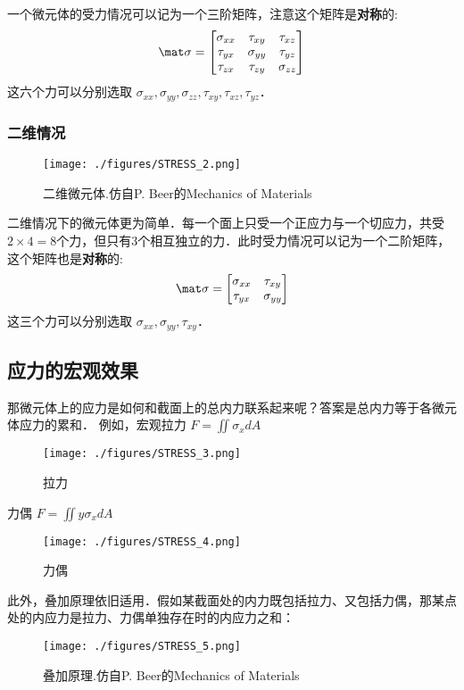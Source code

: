 一个微元体的受力情况可以记为一个三阶矩阵，注意这个矩阵是\textbf{对称}的:
\begin{equation}
\mat \sigma=
\begin{bmatrix}
\sigma_{xx} & \tau_{xy} & \tau_{xz} \\
\tau_{yx} & \sigma_{yy} & \tau_{yz} \\
\tau_{zx} & \tau_{zy} & \sigma_{zz} \\
\end{bmatrix}
\end{equation}
这六个力可以分别选取 $\sigma_{xx}, \sigma_{yy},\sigma_{zz}, \tau_{xy}, \tau_{xz},  \tau_{yz}$．

\subsubsection{二维情况}
\begin{figure}[ht]
\centering
\texttt{[image: ./figures/STRESS\_2.png]}
\caption{二维微元体.仿自P. Beer的Mechanics of Materials} \label{STRESS_fig2}
\end{figure}

二维情况下的微元体更为简单．每一个面上只受一个正应力与一个切应力，共受$2\times4=8$个力，但只有3个相互独立的力．此时受力情况可以记为一个二阶矩阵，这个矩阵也是\textbf{对称}的:
\begin{equation}
\mat \sigma=
\begin{bmatrix}
\sigma_{xx} & \tau_{xy}\\
\tau_{yx} & \sigma_{yy}\\
\end{bmatrix}
\end{equation}
这三个力可以分别选取 $\sigma_{xx}, \sigma_{yy}, \tau_{xy}$．

\subsection{应力的宏观效果}
那微元体上的应力是如何和截面上的总内力联系起来呢？答案是总内力等于各微元体应力的累和．
例如，宏观拉力 $F = \iint \sigma_x dA$
\begin{figure}[ht]
\centering
\texttt{[image: ./figures/STRESS\_3.png]}
\caption{拉力} \label{STRESS_fig3}
\end{figure}

力偶 $F = \iint y\sigma_x dA$
\begin{figure}[ht]
\centering
\texttt{[image: ./figures/STRESS\_4.png]}
\caption{力偶} \label{STRESS_fig4}
\end{figure}

此外，叠加原理依旧适用．假如某截面处的内力既包括拉力、又包括力偶，那某点处的内应力是拉力、力偶单独存在时的内应力之和：
\begin{figure}[ht]
\centering
\texttt{[image: ./figures/STRESS\_5.png]}
\caption{叠加原理.仿自P. Beer的Mechanics of Materials} \label{STRESS_fig5}
\end{figure}
